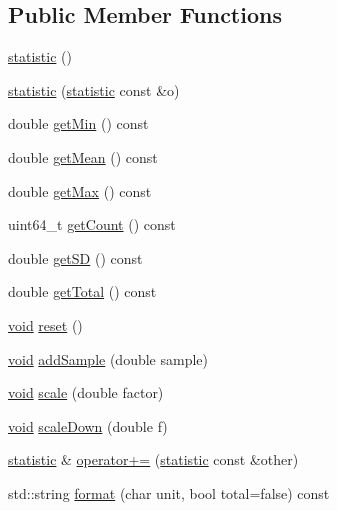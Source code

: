 \subsection*{Public Member Functions}
\begin{DoxyCompactItemize}
\item 
\hyperlink{classstatistic_a3f28cad0a4699e3f2db3892b5556f4e7}{statistic} ()
\item 
\hyperlink{classstatistic_a7ecb0612ab65607ae253b91c5664b756}{statistic} (\hyperlink{classstatistic}{statistic} const \&o)
\item 
double \hyperlink{classstatistic_a74842a553de28750096653e8bf9386d6}{get\-Min} () const 
\item 
double \hyperlink{classstatistic_a57044354c7454db661f485186bde339f}{get\-Mean} () const 
\item 
double \hyperlink{classstatistic_a3b196abb4776e04468138ddfe0b65acd}{get\-Max} () const 
\item 
uint64\-\_\-t \hyperlink{classstatistic_a9c5688424edb33f3a107ca94a6170f08}{get\-Count} () const 
\item 
double \hyperlink{classstatistic_ae90ab239948f240f5fae1d57305196b2}{get\-S\-D} () const 
\item 
double \hyperlink{classstatistic_a4dc72cbd2d3940ecc55a98cbdac91963}{get\-Total} () const 
\item 
\hyperlink{ittnotify__static_8h_af941d56e55e3c5465135b60c4d6343ed}{void} \hyperlink{classstatistic_a5b3a1c2c7c270ef3e6bc077304f57ee1}{reset} ()
\item 
\hyperlink{ittnotify__static_8h_af941d56e55e3c5465135b60c4d6343ed}{void} \hyperlink{classstatistic_a608058fd5fac27c72c6019c607f38688}{add\-Sample} (double sample)
\item 
\hyperlink{ittnotify__static_8h_af941d56e55e3c5465135b60c4d6343ed}{void} \hyperlink{classstatistic_aee49a269c79947670f53f68e24c7d1c9}{scale} (double factor)
\item 
\hyperlink{ittnotify__static_8h_af941d56e55e3c5465135b60c4d6343ed}{void} \hyperlink{classstatistic_add0a3834ecd055e70f48db00df747aea}{scale\-Down} (double f)
\item 
\hyperlink{classstatistic}{statistic} \& \hyperlink{classstatistic_a7fb2040e35a0550e8a7cd0317e326c53}{operator+=} (\hyperlink{classstatistic}{statistic} const \&other)
\item 
std\-::string \hyperlink{classstatistic_a82803f1000193073e46079faf078458d}{format} (char unit, bool total=false) const 
\end{DoxyCompactItemize}
